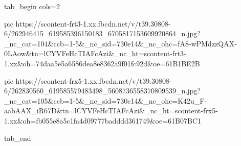  
 
 
 
 

\ifcmt
  tab_begin cols=2

     pic https://scontent-frt3-1.xx.fbcdn.net/v/t39.30808-6/262946415_619585396150183_6705817153609920864_n.jpg?_nc_cat=104&ccb=1-5&_nc_sid=730e14&_nc_ohc=fA8-wPMdzzQAX-0LAow&tn=lCYVFeHcTIAFcAzi&_nc_ht=scontent-frt3-1.xx&oh=74daa5e5a6586dea8e8362a9f01fc92d&oe=61B1BE2B

     pic https://scontent-frx5-1.xx.fbcdn.net/v/t39.30808-6/262830560_619585579483498_5608736558370809539_n.jpg?_nc_cat=105&ccb=1-5&_nc_sid=730e14&_nc_ohc=K42u_F-aabAAX_iR67D&tn=lCYVFeHcTIAFcAzi&_nc_ht=scontent-frx5-1.xx&oh=fb055e8a5c1fa4d09777badddd361749&oe=61B07BC1

  tab_end
\fi
